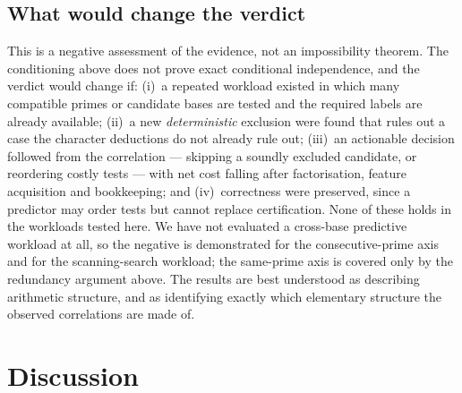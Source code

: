 \documentclass[11pt,reqno]{amsart}
\theoremstyle{plain}
\theoremstyle{definition}
\begin{document}
\subsection*{What would change the verdict}
This is a negative assessment of the evidence, not an impossibility theorem. The conditioning
above does not prove exact conditional independence, and the verdict would change if: (i)~a
repeated workload existed in which many compatible primes or candidate bases are tested and the
required labels are already available; (ii)~a new \emph{deterministic} exclusion were found that
rules out a case the character deductions do not already rule out; (iii)~an actionable decision
followed from the correlation --- skipping a soundly excluded candidate, or reordering costly
tests --- with net cost falling after factorisation, feature acquisition and bookkeeping; and
(iv)~correctness were preserved, since a predictor may order tests but cannot replace
certification. None of these holds in the workloads tested here. We have not evaluated a
cross-base predictive workload at all, so the negative is demonstrated for the consecutive-prime
axis and for the scanning-search workload; the same-prime axis is covered only by the redundancy
argument above. The results are best understood as describing arithmetic structure, and as
identifying exactly which elementary structure the observed correlations are made of.



\section{Discussion}
\label{sec:discussion}
\end{document}

